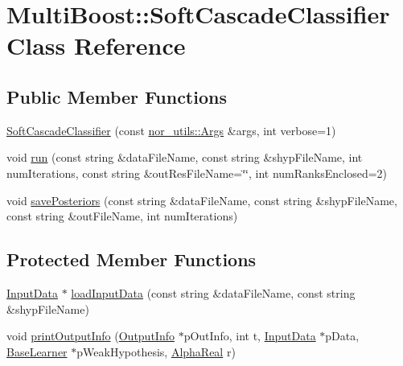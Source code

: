 \hypertarget{classMultiBoost_1_1SoftCascadeClassifier}{\section{Multi\-Boost\-:\-:Soft\-Cascade\-Classifier Class Reference}
\label{classMultiBoost_1_1SoftCascadeClassifier}
}
\subsection*{Public Member Functions}
\begin{DoxyCompactItemize}
\item 
\hyperlink{classMultiBoost_1_1SoftCascadeClassifier_aaa7c17b3191c458ae423034ec37266cd}{Soft\-Cascade\-Classifier} (const \hyperlink{classnor__utils_1_1Args}{nor\-\_\-utils\-::\-Args} \&args, int verbose=1)
\item 
void \hyperlink{classMultiBoost_1_1SoftCascadeClassifier_a394049a60917fde89e09937e9f86e214}{run} (const string \&data\-File\-Name, const string \&shyp\-File\-Name, int num\-Iterations, const string \&out\-Res\-File\-Name=\char`\"{}\char`\"{}, int num\-Ranks\-Enclosed=2)
\item 
void \hyperlink{classMultiBoost_1_1SoftCascadeClassifier_a9a2f00d323335480a30e03da11f66753}{save\-Posteriors} (const string \&data\-File\-Name, const string \&shyp\-File\-Name, const string \&out\-File\-Name, int num\-Iterations)
\end{DoxyCompactItemize}
\subsection*{Protected Member Functions}
\begin{DoxyCompactItemize}
\item 
\hyperlink{classMultiBoost_1_1InputData}{Input\-Data} $\ast$ \hyperlink{classMultiBoost_1_1SoftCascadeClassifier_af4f8becc943de707f3e658d909233029}{load\-Input\-Data} (const string \&data\-File\-Name, const string \&shyp\-File\-Name)
\item 
void \hyperlink{classMultiBoost_1_1SoftCascadeClassifier_aa59207416cbc3d9230121f259dc811c2}{print\-Output\-Info} (\hyperlink{classMultiBoost_1_1OutputInfo}{Output\-Info} $\ast$p\-Out\-Info, int t, \hyperlink{classMultiBoost_1_1InputData}{Input\-Data} $\ast$p\-Data, \hyperlink{classMultiBoost_1_1BaseLearner}{Base\-Learner} $\ast$p\-Weak\-Hypothesis, \hyperlink{Defaults_8h_a80184c4fd10ab70a1a17c5f97dcd1563}{Alpha\-Real} r)
\end{DoxyCompactItemize}
